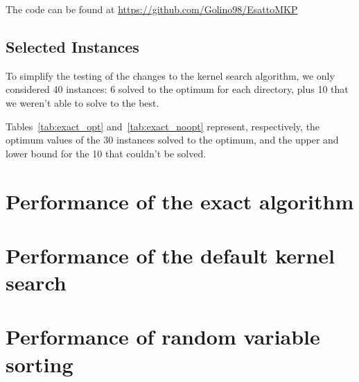 The code can be found at \url{https://github.com/Golino98/EsattoMKP}

\subsection{Selected Instances}\label{subsec:inst}
To simplify the testing of the changes to the kernel search algorithm,
we only considered 40 instances: 6 solved to the optimum for each directory,
plus 10 that we weren't able to solve to the best.

Tables~\ref{tab:exact_opt} and~\ref{tab:exact_noopt} represent,
respectively, the optimum values of the 30 instances solved to
the optimum, and the upper and lower bound for the 10
that couldn't be solved.





\section{Performance of the exact algorithm}


\section{Performance of the default kernel search}


\section{Performance of random variable sorting}
